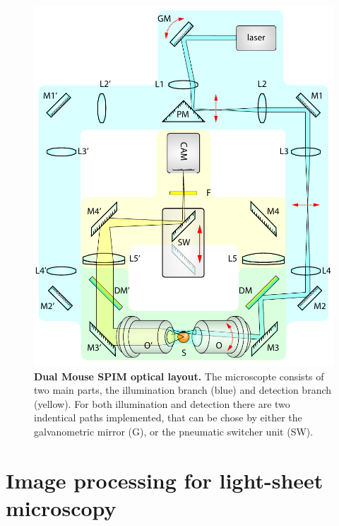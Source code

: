 \documentclass{diploma_style}
\begin{document}
\begin{figure}[hbt]
	\centering
	\includegraphics[page=1,width=1\textwidth]{figures/2_DualMouse/fullSchematics}
	\caption{\textbf{Dual Mouse SPIM optical layout.} The microscopte consists of two main parts, the illumination branch (blue) and detection branch (yellow). For both illumination and detection there are two indentical paths implemented, that can be chose by either the galvanometric mirror (G), or the pneumatic switcher unit (SW). 
}
	\label{fig:dslm}
\end{figure}

	
\chapter{Image processing for light-sheet microscopy}
\end{document}

